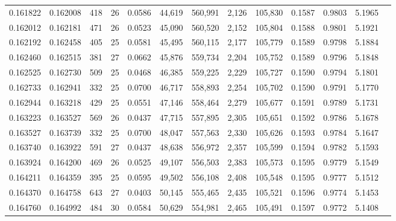 \begin{tabular}{rrrrrrrrrrrrr}
0.161822 & 0.162008 &   418 &  26 &                                     0.0586 &  44,619 & 560,991 &   2,126 & 105,830 & 0.1587 & 0.9803 & 5.1965 \\
0.162012 & 0.162181 &   471 &  26 &                                     0.0523 &  45,090 & 560,520 &   2,152 & 105,804 & 0.1588 & 0.9801 & 5.1921 \\
0.162192 & 0.162458 &   405 &  25 &                                     0.0581 &  45,495 & 560,115 &   2,177 & 105,779 & 0.1589 & 0.9798 & 5.1884 \\
0.162460 & 0.162515 &   381 &  27 &                                     0.0662 &  45,876 & 559,734 &   2,204 & 105,752 & 0.1589 & 0.9796 & 5.1848 \\
0.162525 & 0.162730 &   509 &  25 &                                     0.0468 &  46,385 & 559,225 &   2,229 & 105,727 & 0.1590 & 0.9794 & 5.1801 \\
0.162733 & 0.162941 &   332 &  25 &                                     0.0700 &  46,717 & 558,893 &   2,254 & 105,702 & 0.1590 & 0.9791 & 5.1770 \\
0.162944 & 0.163218 &   429 &  25 &                                     0.0551 &  47,146 & 558,464 &   2,279 & 105,677 & 0.1591 & 0.9789 & 5.1731 \\
0.163223 & 0.163527 &   569 &  26 &                                     0.0437 &  47,715 & 557,895 &   2,305 & 105,651 & 0.1592 & 0.9786 & 5.1678 \\
0.163527 & 0.163739 &   332 &  25 &                                     0.0700 &  48,047 & 557,563 &   2,330 & 105,626 & 0.1593 & 0.9784 & 5.1647 \\
0.163740 & 0.163922 &   591 &  27 &                                     0.0437 &  48,638 & 556,972 &   2,357 & 105,599 & 0.1594 & 0.9782 & 5.1593 \\
0.163924 & 0.164200 &   469 &  26 &                                     0.0525 &  49,107 & 556,503 &   2,383 & 105,573 & 0.1595 & 0.9779 & 5.1549 \\
0.164211 & 0.164359 &   395 &  25 &                                     0.0595 &  49,502 & 556,108 &   2,408 & 105,548 & 0.1595 & 0.9777 & 5.1512 \\
0.164370 & 0.164758 &   643 &  27 &                                     0.0403 &  50,145 & 555,465 &   2,435 & 105,521 & 0.1596 & 0.9774 & 5.1453 \\
0.164760 & 0.164992 &   484 &  30 &                                     0.0584 &  50,629 & 554,981 &   2,465 & 105,491 & 0.1597 & 0.9772 & 5.1408 \\

\end{tabular}
